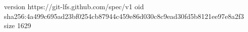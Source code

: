version https://git-lfs.github.com/spec/v1
oid sha256:4a499c695ad23bf0254cb87944c459e86d030c8c9ead30fd5b8121ee97e8a2f3
size 1629
